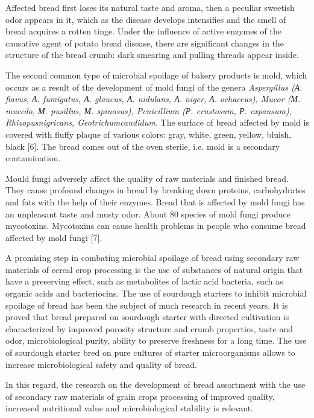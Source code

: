 Affected bread first loses its natural taste and aroma, then a peculiar
sweetish odor appears in it, which as the disease develops intensifies
and the smell of bread acquires a rotten tinge. Under the influence of
active enzymes of the causative agent of potato bread disease, there are
significant changes in the structure of the bread crumb: dark smearing
and pulling threads appear inside.

The second common type of microbial spoilage of bakery products is mold,
which occurs as a result of the development of mold fungi of the genera
\emph{Aspergillus (А. fiavus, А. fumigatus, А. glaucus, А. nidulans, А.
niger, А. ochaceus), Mucor (М. mucedo, М. pusillus, М. spinosus),
Penicillium (Р. crustosum, Р. expansum), Rhizopusnigricans,
Geotrichumcandidum.} The surface of bread affected by mold is covered
with fluffy plaque of various colors: gray, white, green, yellow,
bluish, black {[}6{]}. The bread comes out of the oven sterile, i.e.
mold is a secondary contamination.

Mould fungi adversely affect the quality of raw materials and finished
bread. They cause profound changes in bread by breaking down proteins,
carbohydrates and fats with the help of their enzymes. Bread that is
affected by mold fungi has an unpleasant taste and musty odor. About 80
species of mold fungi produce mycotoxins. Mycotoxins can cause health
problems in people who consume bread affected by mold fungi {[}7{]}.

A promising step in combating microbial spoilage of bread using
secondary raw materials of cereal crop processing is the use of
substances of natural origin that have a preserving effect, such as
metabolites of lactic acid bacteria, such as organic acids and
bacteriocins. The use of sourdough starters to inhibit microbial
spoilage of bread has been the subject of much research in recent years.
It is proved that bread prepared on sourdough starter with directed
cultivation is characterized by improved porosity structure and crumb
properties, taste and odor, microbiological purity, ability to preserve
freshness for a long time. The use of sourdough starter bred on pure
cultures of starter microorganisms allows to increase microbiological
safety and quality of bread.

In this regard, the research on the development of bread assortment with
the use of secondary raw materials of grain crops processing of improved
quality, increased nutritional value and microbiological stability is
relevant.

